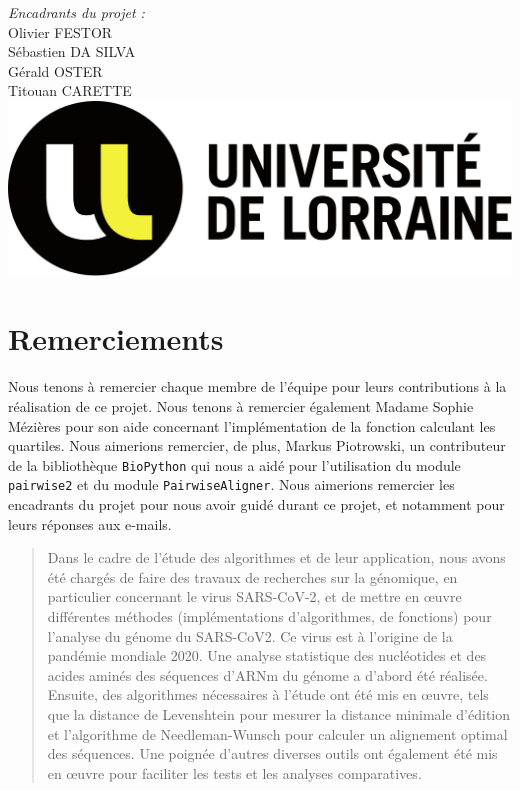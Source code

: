 \documentclass[12pt]{article}
\begin{document}
\begin{titlepage}
	\large
	\emph{Encadrants du projet :}\\
	   Olivier FESTOR\\
	   Sébastien DA SILVA\\
	   Gérald OSTER\\
	   Titouan CARETTE\\[1.5 cm]

	\includegraphics[scale=0.15]{logo_UL_horizontal}\\[1.5 cm]

	\vfill
\end{titlepage}

\section*{Remerciements}
Nous tenons à remercier chaque membre de l'équipe pour leurs contributions à la réalisation de ce projet. Nous tenons à remercier également Madame Sophie Mézières pour son aide concernant l'implémentation de la fonction calculant les quartiles. Nous aimerions remercier, de plus, Markus Piotrowski, un contributeur de la bibliothèque \texttt{BioPython} qui nous a aidé pour l'utilisation du module \texttt{pairwise2} et du module \texttt{PairwiseAligner}. Nous aimerions remercier les encadrants du projet pour nous avoir guidé durant ce projet, et notamment pour leurs réponses aux e-mails.\\[2.5 cm]


\begin{abstract}
    Dans le cadre de l'étude des algorithmes et de leur application, nous avons été chargés de faire des travaux de recherches sur la génomique, en particulier concernant le virus SARS-CoV-2, et de mettre en œuvre différentes méthodes (implémentations d'algorithmes, de fonctions) pour l'analyse du génome du SARS-CoV2. Ce virus est à l'origine de la pandémie mondiale 2020. Une analyse statistique des nucléotides et des acides aminés des séquences d'ARNm du génome a d'abord été réalisée. Ensuite, des algorithmes nécessaires à l'étude ont été mis en œuvre, tels que la distance de Levenshtein pour mesurer la distance minimale d'édition et l'algorithme de Needleman-Wunsch pour calculer un alignement optimal des séquences. Une poignée d'autres diverses outils ont également été mis en œuvre pour faciliter les tests et les analyses comparatives.
\end{abstract}
\end{document}
